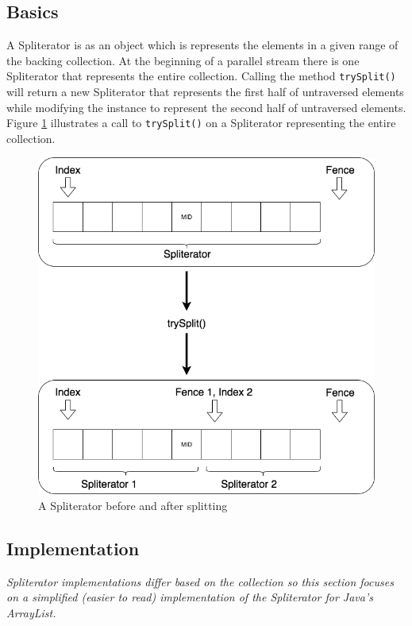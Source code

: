 \documentclass[]{article}
\begin{document}
\subsection{Basics}
A Spliterator is as an object which is represents the elements in a given range of the backing collection. At the beginning of a parallel stream there is one Spliterator that represents the entire collection. Calling the method \verb|trySplit()| will return a new Spliterator that represents the first half of untraversed elements while modifying the instance to represent the second half of untraversed elements. Figure \ref{fig:split} illustrates a call to \verb|trySplit()| on a Spliterator representing the entire collection.

\begin{figure}[H]
\includegraphics[width=\linewidth]{images/spliterator_illustrated.png}
\caption{A Spliterator before and after splitting}
\label{fig:split}
\end{figure}

\subsection{Implementation}
\textit{Spliterator implementations differ based on the collection so this section focuses on a simplified (easier to read) implementation of the Spliterator for Java's ArrayList.}
\end{document}
